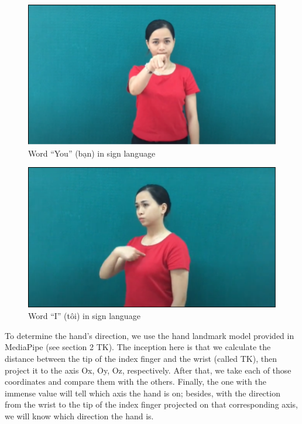 \begin{figure}[H]
  \centering
  \includegraphics[width=\textwidth]{img/Chap4/WordYouInSignLanguage.png}
  \caption{Word “You” (bạn) in sign language}
  \label{fig:Chap4-WordYouInSignLanguage}
\end{figure}

\begin{figure}[H]
  \centering
  \includegraphics[width=\textwidth]{img/Chap4/WordIInSignLanguage.png}
  \caption{Word “I” (tôi) in sign language}
  \label{fig:Chap4-WordIInSignLanguage}
\end{figure}

To determine the hand’s direction, we use the hand landmark model provided in MediaPipe (see section 2 TK). The inception here is that we calculate the distance between the tip of the index finger and the wrist (called TK), then project it to the axis Ox, Oy, Oz, respectively. After that, we take each of those coordinates and compare them with the others. Finally, the one with the immense value will tell which axis the hand is on; besides, with the direction from the wrist to the tip of the index finger projected on that corresponding axis, we will know which direction the hand is.

